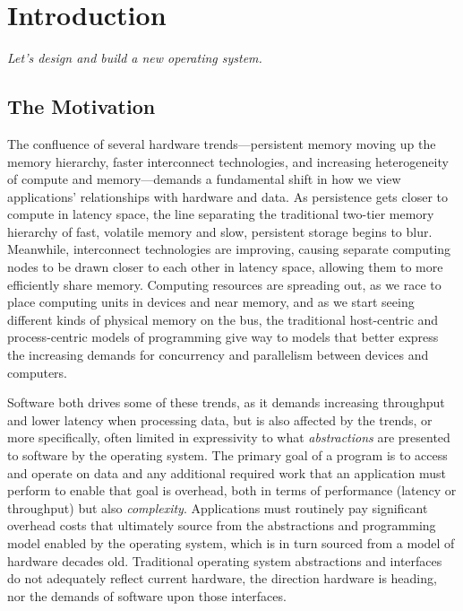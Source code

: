 
\chapter{Introduction}\label{ch:intro}

\emph{Let's design and build a new operating system.}

\section*{The Motivation}

The confluence of several hardware trends---persistent memory moving up the memory hierarchy, faster interconnect
technologies, and increasing heterogeneity of compute and memory---demands a fundamental shift in how we view
applications' relationships with hardware and data. As persistence gets closer to compute in latency space, the line separating the traditional two-tier
memory hierarchy of fast, volatile memory and slow, persistent storage begins to blur. Meanwhile, interconnect technologies
are improving, causing separate computing nodes to be drawn closer to each other in latency space, allowing them to more efficiently
share memory. Computing resources are spreading out, as we race to place computing units in devices and near memory, and as
we start seeing different kinds of physical memory on the bus, the traditional host-centric and process-centric models
of programming give way to models that better express the increasing demands for concurrency and parallelism between
devices and computers.

Software both drives some of these trends, as it demands increasing throughput and lower latency when processing data,
but is also affected by the trends, or more specifically, often limited in expressivity to what \emph{abstractions} are
presented to software by the operating system. The primary goal of a program is to access and operate on data and any
additional required work that an application must perform to enable that goal is overhead, both in terms of performance
(latency or throughput) but also \emph{complexity}. Applications must routinely pay significant overhead costs that
ultimately source from the abstractions and programming model enabled by the operating system, which is in turn sourced
from a model of hardware decades old.
Traditional operating system abstractions and interfaces do not adequately reflect current hardware, the direction hardware is
heading, nor the demands of software upon those interfaces.

